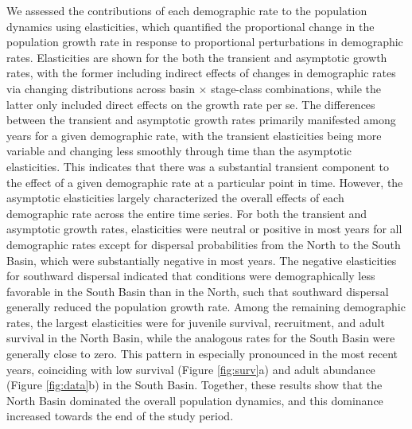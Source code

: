 \documentclass[11pt]{article}
\begin{document}
We assessed the contributions of each demographic rate to the population dynamics
using elasticities,
which quantified the proportional change in the population growth rate in
response to proportional perturbations in demographic rates.
Elasticities are shown for the both the transient and asymptotic growth rates,
with the former including indirect effects of changes in demographic rates
via changing distributions across basin $\times$ stage-class combinations,
while the latter only included direct effects on the growth rate per se.
The differences between the transient and asymptotic growth rates primarily manifested
among years for a given demographic rate,
with the transient elasticities being more variable and changing less smoothly through time
than the asymptotic elasticities.
This indicates that there was a substantial transient component to the effect of a
given demographic rate at a particular point in time.
However, the asymptotic elasticities largely characterized the overall
effects of each demographic rate across the entire time series.
For both the transient and asymptotic growth rates,
elasticities were neutral or positive in most years for all demographic rates
except for dispersal probabilities from the North to the South Basin,
which were substantially negative in most years.
The negative elasticities for southward dispersal indicated that conditions were
demographically less favorable in the South Basin than in the North,
such that southward dispersal generally reduced the population growth rate.
Among the remaining demographic rates,
the largest elasticities were for juvenile survival, recruitment, and adult survival
in the North Basin, while the analogous rates for the South Basin were generally close to zero.
This pattern in especially pronounced in the most recent years,
coinciding with low survival (Figure \ref{fig:surv}a)
and adult abundance (Figure \ref{fig:data}b) in the South Basin.
Together, these results show that the North Basin dominated
the overall population dynamics,
and this dominance increased towards the end of the study period.





\end{document}
